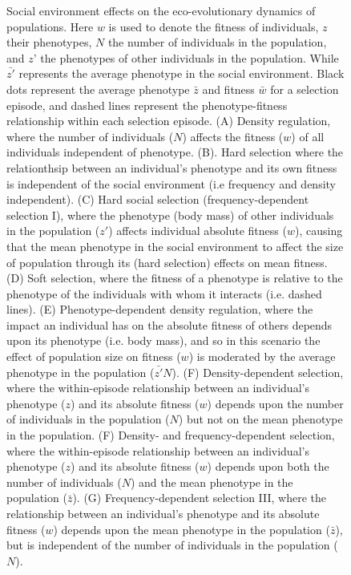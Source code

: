 \documentclass{article}
\begin{document}
\begin{figure} [H]
	\caption{Social environment effects on the eco-evolutionary dynamics of populations. Here $w$ is used to denote the fitness of individuals, $z$ their phenotypes, $N$ the number of individuals in the population, and $z’$ the phenotypes of other individuals in the population. While $\bar{z'}$ represents the average phenotype in the social environment. Black dots represent the average phenotype $\bar{z}$ and fitness $\bar{w}$ for a selection episode, and dashed lines represent the phenotype-fitness relationship within each selection episode. (A) Density regulation, where the number of individuals ($N$) affects the fitness ($w$) of all individuals independent of phenotype. (B). Hard selection where the relationthsip between an individual's phenotype and its own fitness is independent of the social environment (i.e frequency and density independent).  (C) Hard social selection (frequency-dependent selection I), where the phenotype (body mass) of other individuals in the population ($z'$) affects individual absolute fitness ($w$), causing that the mean phenotype in the social environment to affect the size of population through its (hard selection) effects on mean fitness. (D) Soft selection, where the fitness  of a phenotype is relative to the phenotype of the individuals with whom it interacts (i.e. dashed lines). (E) Phenotype-dependent density regulation, where the impact an individual has on the absolute fitness of others depends upon its phenotype (i.e. body mass), and so in this scenario the effect of population size on fitness ($w$) is moderated by the average phenotype in the population ($\bar{z'}N$). (F) Density-dependent selection, where the within-episode relationship between an individual's phenotype ($z$) and its absolute fitness ($w$) depends upon the number of individuals in the population ($N$) but not on the mean phenotype in the population. (F) Density- and frequency-dependent selection, where the within-episode relationship between an individual's phenotype ($z$) and its absolute fitness ($w$) depends upon both the number of individuals ($N$) and the mean phenotype in the population ($\bar{z}$). (G) Frequency-dependent selection III, where the relationship between an individual's phenotype and its absolute fitness ($w$) depends upon the mean phenotype in the population ($\bar{z}$), but is independent of the number of individuals in the population ($N$).} \label{fig:selection}
\end{figure}
\end{document}
